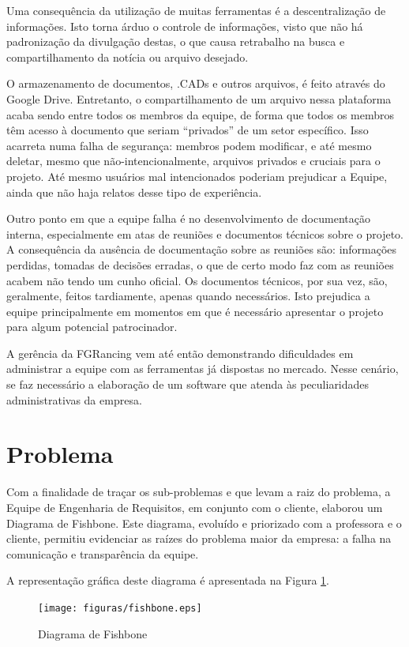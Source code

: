 Uma consequência da utilização de muitas ferramentas é a descentralização de informações. Isto torna árduo o controle de
informações, visto que não há padronização da divulgação destas, o que causa retrabalho na busca e compartilhamento da notícia
ou arquivo desejado.

O armazenamento de  documentos, .CADs e outros arquivos, é feito através do Google Drive. Entretanto, o compartilhamento de
 um arquivo nessa plataforma acaba sendo entre todos os membros da equipe, de forma que todos os membros têm acesso à
 documento que seriam “privados” de um setor específico. Isso acarreta numa falha de segurança: membros podem modificar, e
  até mesmo deletar, mesmo que não-intencionalmente, arquivos privados e cruciais para o projeto. Até mesmo usuários mal
  intencionados poderiam prejudicar a Equipe, ainda que não haja relatos desse tipo de experiência.

Outro ponto em que a equipe falha é no desenvolvimento de documentação interna, especialmente em atas de reuniões e documentos
 técnicos sobre o projeto. A consequência da ausência de documentação sobre as reuniões são: informações perdidas, tomadas
  de decisões erradas, o que de certo modo faz com as reuniões acabem não tendo um cunho oficial. Os documentos técnicos,
  por sua vez, são, geralmente, feitos tardiamente, apenas quando necessários. Isto prejudica a equipe principalmente em
  momentos em que é necessário apresentar o projeto para algum potencial patrocinador.

A gerência da FGRancing vem até então demonstrando dificuldades em administrar a equipe com as ferramentas já dispostas
 no mercado. Nesse cenário, se faz necessário a elaboração de um software que atenda às peculiaridades	administrativas
  da empresa.
  \pagebreak

\section{Problema}
Com a finalidade de traçar os sub-problemas e que levam a raiz do problema, a Equipe de Engenharia de Requisitos, em conjunto com o cliente, elaborou um Diagrama de Fishbone. Este diagrama, evoluído e priorizado com a professora e o cliente, permitiu evidenciar as raízes do problema maior da empresa: a falha na comunicação e transparência da equipe.

A representação gráfica deste diagrama é apresentada na Figura \ref{fishbone}.

\begin{figure}[!h]
        \centering
        \texttt{[image: figuras/fishbone.eps]}
        \caption{Diagrama de Fishbone\label{fishbone}}
\end{figure}


